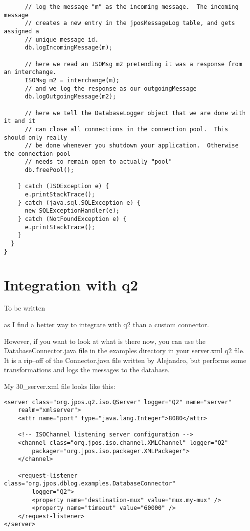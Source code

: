 \documentclass[11pt]{report}
\begin{document}
\begin{flushleft}
\begin{verbatim}
      // log the message "m" as the incoming message.  The incoming message
      // creates a new entry in the jposMessageLog table, and gets assigned a 
      // unique message id.
      db.logIncomingMessage(m);

      // here we read an ISOMsg m2 pretending it was a response from an interchange.
      ISOMsg m2 = interchange(m);
      // and we log the response as our outgoingMessage
      db.logOutgoingMessage(m2);

      // here we tell the DatabaseLogger object that we are done with it and it
      // can close all connections in the connection pool.  This should only really
      // be done whenever you shutdown your application.  Otherwise the connection pool
      // needs to remain open to actually "pool"
      db.freePool();

    } catch (ISOException e) {
      e.printStackTrace();
    } catch (java.sql.SQLException e) {
      new SQLExceptionHandler(e);
    } catch (NotFoundException e) {
      e.printStackTrace();
    }
  }
}

\end{verbatim}


\chapter{Integration with q2}
\begin{bf}To be written\end{bf} as I find a better way to integrate with q2 than a custom connector.

However, if you want to look at what is there now, you can use the
DatabaseConnector.java file in the examples directory in your server.xml q2
file.  It is a rip--off of the Connector.java file written by Alejandro, but
performs some transformations and logs the messages to the database.

My 30\_server.xml file looks like this:
\begin{verbatim}
<server class="org.jpos.q2.iso.QServer" logger="Q2" name="server"
    realm="xmlserver">
    <attr name="port" type="java.lang.Integer">8080</attr>

    <!-- ISOChannel listening server configuration -->
    <channel class="org.jpos.iso.channel.XMLChannel" logger="Q2"
        packager="org.jpos.iso.packager.XMLPackager">
    </channel>

    <request-listener class="org.jpos.dblog.examples.DatabaseConnector" 
        logger="Q2">
        <property name="destination-mux" value="mux.my-mux" />
        <property name="timeout" value="60000" />
    </request-listener>
</server>
\end{verbatim}


\end{flushleft}
\end{document}
